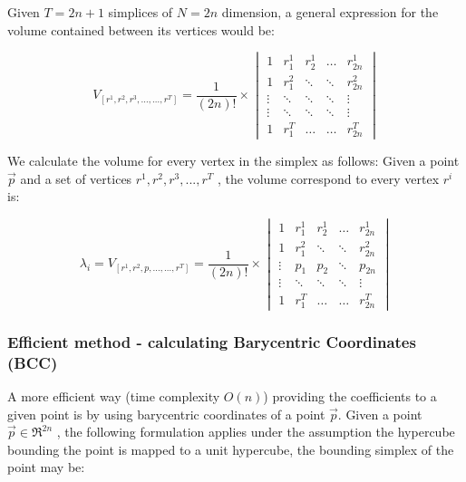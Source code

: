\begin{}
		Given $T = 2n+1$ simplices of $N = 2n$ dimension, a general expression for the volume contained between its vertices would be:
		
	
		\begin{equation}
		V_{[r^1,r^2,r^3,\dots,\dots,r^T]} = \frac{1}{(2n)!} \times \begin{vmatrix}
		1 & r_1^1 & r_2^1 & \dots & r_{2n}^1\\ 
		1 & r_1^2 & \ddots & \ddots & r_{2n}^2\\ 
		\vdots & \ddots & \ddots & \ddots & \vdots \\ 
		\vdots & \ddots & \ddots & \ddots & \vdots\\ 
		1 & r_{1}^T &  \dots& \dots & r_{2n}^T
		\end{vmatrix}
		\end{equation}
				
    	We calculate the volume for every vertex in the simplex as follows:
		Given a point $\overrightarrow{p}$ and a set of vertices $r^1,r^2,r^3,...,r^T$ ,  the volume correspond to every vertex $r^i$ is: 
		
		\begin{equation}
			\lambda_i = 	V_{[r^1,r^2,p,\dots,\dots,r^T]} = \frac{1}{(2n)!} \times \begin{vmatrix}
				1 & r_1^1 & r_2^1 & \dots & r_{2n}^1\\ 
				1 & r_1^2 & \ddots & \ddots & r_{2n}^2\\ 
				\vdots &  p_1  & p_2 & \ddots & p_{2n} \\ 
				\vdots & \ddots & \ddots & \ddots & \vdots\\ 
				1 & r_{1}^T &  \dots& \dots & r_{2n}^T
				\end{vmatrix}
		\end{equation}
			
		\subsubsection{Efficient method - calculating Barycentric Coordinates (BCC)}
		
		A more efficient way (time complexity $O(n)$) providing the coefficients to a given point is by using barycentric coordinates of a point $\overrightarrow{p}$.
		Given a point $\overrightarrow{p} \in \Re^{2n}$ , the following formulation applies under the assumption the hypercube bounding the point is mapped to a unit hypercube, the bounding simplex of the point may be: \\ \\ 
		

\end{}

